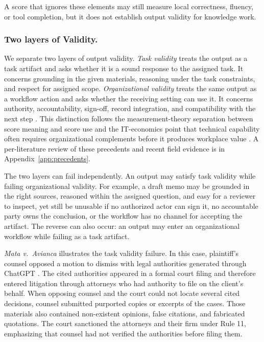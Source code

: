 \documentclass{article}
\begin{document}
A score that ignores these elements may still measure local correctness, fluency, or tool completion, but it does not establish output validity for knowledge work.    


\subsubsection{Two layers of Validity.}\label{sec:two-layers}
We separate two layers of output validity.
\emph{Task validity} treats the output as a task artifact and asks whether it is a sound response to the assigned task.
It concerns grounding in the given materials, reasoning under the task constraints, and respect for assigned scope.
\emph{Organizational validity} treats the same output as a workflow action and asks whether the receiving setting can use it.
It concerns authority, accountability, sign-off, record integration, and compatibility with the next step \citep{bresnahan2002it,kellogg2020algorithms}. This distinction follows the measurement-theory separation between score meaning and score use \citep{messick1989validity,Messick1995,aera2014standards,kane2013validating} and the IT-economics point that technical capability often requires organizational complements before it produces workplace value \citep{bresnahan2002it}. A per-literature review of these precedents and recent field evidence is in Appendix~\ref{app:precedents}.

The two layers can fail independently.
An output may satisfy task validity while failing organizational validity.
For example, a draft memo may be grounded in the right sources, reasoned within the assigned question, and easy for a reviewer to inspect, yet still be unusable if no authorized actor can sign it, no accountable party owns the conclusion, or the workflow has no channel for accepting the artifact.
The reverse can also occur: an output may enter an organizational workflow while failing as a task artifact.

\emph{Mata v.\ Avianca} illustrates the task validity failure.
In this case, plaintiff's counsel opposed a motion to dismiss with legal authorities generated through ChatGPT \citep{mata2023avianca}.
The cited authorities appeared in a formal court filing and therefore entered litigation through attorneys who had authority to file on the client's behalf.
When opposing counsel and the court could not locate several cited decisions, counsel submitted purported copies or excerpts of the cases.
Those materials also contained non-existent opinions, false citations, and fabricated quotations.
The court sanctioned the attorneys and their firm under Rule 11, emphasizing that counsel had not verified the authorities before filing them.
\end{document}
